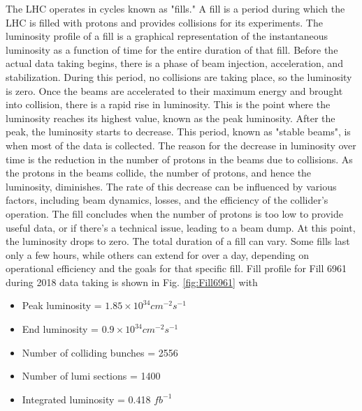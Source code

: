 The LHC operates in cycles known as "fills." A fill is a period during which the LHC is filled with protons and provides collisions for its experiments. The luminosity profile of a fill is a graphical representation of the instantaneous luminosity as a function of time for the entire duration of that fill. Before the actual data taking begins, there is a phase of beam injection, acceleration, and stabilization. During this period, no collisions are taking place, so the luminosity is zero. Once the beams are accelerated to their maximum energy and brought into collision, there is a rapid rise in luminosity. This is the point where the luminosity reaches its highest value, known as the peak luminosity. After the peak, the luminosity starts to decrease. This period, known as "stable beams", is when most of the data is collected. The reason for the decrease in luminosity over time is the reduction in the number of protons in the beams due to collisions. As the protons in the beams collide, the number of protons, and hence the luminosity, diminishes. The rate of this decrease can be influenced by various factors, including beam dynamics, losses, and the efficiency of the collider's operation. The fill concludes when the number of protons is too low to provide useful data, or if there's a technical issue, leading to a beam dump. At this point, the luminosity drops to zero. The total duration of a fill can vary. Some fills last only a few hours, while others can extend for over a day, depending on operational efficiency and the goals for that specific fill. Fill profile for Fill 6961 during 2018 data taking is shown in Fig. \ref{fig:Fill6961} with

\begin{itemize}
  
\item Peak luminosity = $1.85 \times 10^{34} cm^{-2} s^{-1}$
\item End luminosity = $0.9 \times 10^{34} cm^{-2} s^{-1}$ 
\item Number of colliding bunches = 2556
\item Number of lumi sections = 1400
\item Integrated luminosity = 0.418 $fb^{-1}$

\end{itemize}
    
